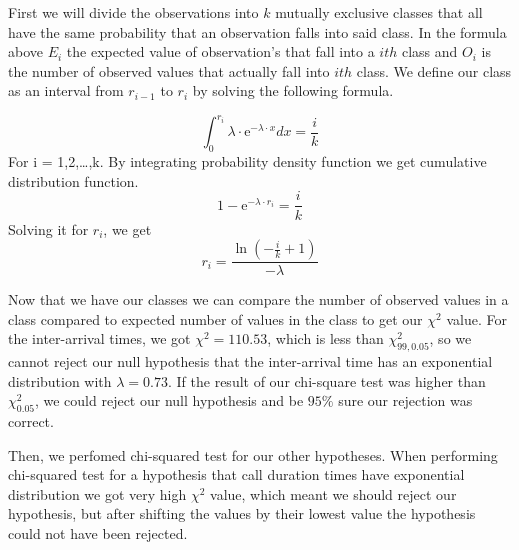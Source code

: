 \documentclass[12pt,a4paper]{article}
\begin{document}
First we will divide the observations into $k$ mutually exclusive classes that all have the same probability that an observation falls into said class. In the formula above $E_i$ the expected value of observation's that fall into a $ith$ class and $O_i$ is the number of observed values that actually fall into $ith$ class. We define our class as an interval from $r_{i-1}$ to $r_i$ by solving the following formula.

\begin{equation} \int_{0}^{r_i}\lambda\cdot\mathrm{e}^{-\lambda\cdot x}dx = \frac{i}{k} \end{equation}
For i = 1,2,…,k. By integrating probability density function we get cumulative distribution function.
\begin{equation} 1 - \mathrm{e}^{-\lambda\cdot r_i} = \frac{i}{k} \end{equation}
Solving it for $r_i$, we get
\begin{equation} r_i = \frac{\ln(-\frac{i}{k} + 1)}{-\lambda} \end{equation}

Now that we have our classes we can compare the number of observed values in a class compared to expected number of values in the class to get our $\chi^2$ value. For the inter-arrival times, we got $\chi^2=110.53$, which is less than $\chi^2_{99, 0.05}$, so we cannot reject our null hypothesis that the inter-arrival time has an exponential distribution with $\lambda=0.73$. If the result of our chi-square test was higher than $\chi^2_{0.05}$, we could reject our null hypothesis and be $95\%$ sure our rejection was correct.
\par \medskip
Then, we perfomed chi-squared test for our other hypotheses. When performing chi-squared test for a hypothesis that call duration times have exponential distribution we got very high $\chi^2$ value, which meant we should reject our hypothesis, but after shifting the values by their lowest value the hypothesis could not have been rejected.
\end{document}
